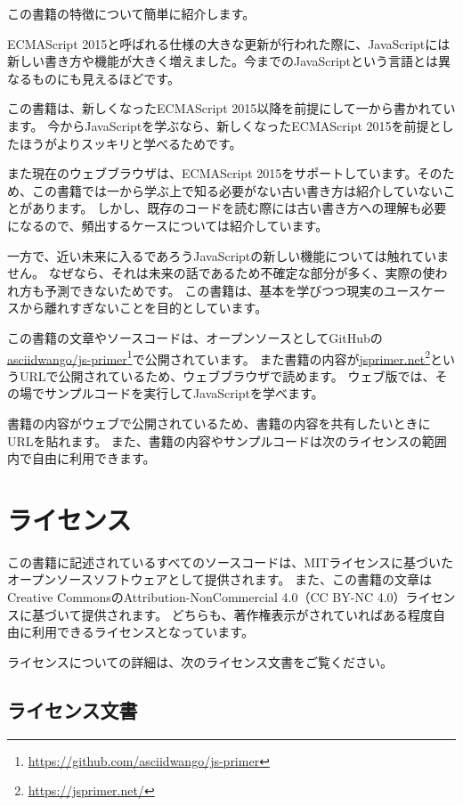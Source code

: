 この書籍の特徴について簡単に紹介します。

ECMAScript
2015と呼ばれる仕様の大きな更新が行われた際に、JavaScriptには新しい書き方や機能が大きく増えました。今までのJavaScriptという言語とは異なるものにも見えるほどです。

この書籍は、新しくなったECMAScript
2015以降を前提にして一から書かれています。
今からJavaScriptを学ぶなら、新しくなったECMAScript
2015を前提としたほうがよりスッキリと学べるためです。

また現在のウェブブラウザは、ECMAScript
2015をサポートしています。そのため、この書籍では一から学ぶ上で知る必要がない古い書き方は紹介していないことがあります。
しかし、既存のコードを読む際には古い書き方への理解も必要になるので、頻出するケースについては紹介しています。

一方で、近い未来に入るであろうJavaScriptの新しい機能については触れていません。
なぜなら、それは未来の話であるため不確定な部分が多く、実際の使われ方も予測できないためです。
この書籍は、基本を学びつつ現実のユースケースから離れすぎないことを目的としています。

この書籍の文章やソースコードは、オープンソースとしてGitHubの\href{https://github.com/asciidwango/js-primer}{asciidwango/js-primer}\footnote{\url{https://github.com/asciidwango/js-primer}}で公開されています。
また書籍の内容が\href{https://jsprimer.net/}{jsprimer.net}\footnote{\url{https://jsprimer.net/}}というURLで公開されているため、ウェブブラウザで読めます。
ウェブ版では、その場でサンプルコードを実行してJavaScriptを学べます。

書籍の内容がウェブで公開されているため、書籍の内容を共有したいときにURLを貼れます。
また、書籍の内容やサンプルコードは次のライセンスの範囲内で自由に利用できます。

\hypertarget{license}{%
\section*{ライセンス}\label{license}}

この書籍に記述されているすべてのソースコードは、MITライセンスに基づいたオープンソースソフトウェアとして提供されます。
また、この書籍の文章はCreative CommonsのAttribution-NonCommercial
4.0（CC BY-NC 4.0）ライセンスに基づいて提供されます。
どちらも、著作権表示がされていればある程度自由に利用できるライセンスとなっています。

ライセンスについての詳細は、次のライセンス文書をご覧ください。

\subsection*{ライセンス文書}

